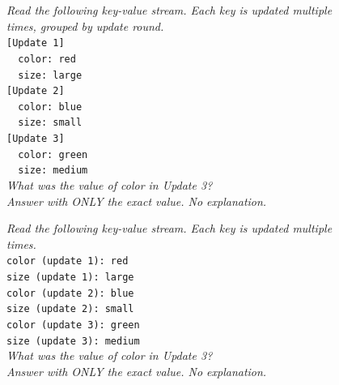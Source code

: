 \documentclass[letterpaper]{article} %
\begin{document}
\begin{figure}[h]
\begin{minipage}[t]{0.48\textwidth}
\begin{tcolorbox}[
    colframe=black!30, colback=gray!4,
    boxrule=0.5pt, arc=2pt,
    left=6pt, right=6pt, top=4pt, bottom=4pt,
    equal height group=fmts,
    title={\textbf{Block} (\texttt{block})},
    fonttitle=\small\bfseries,
    coltitle=black]
\emph{Read the following key-value stream. Each key is updated
multiple times, grouped by update round.}\\[4pt]
\texttt{[Update 1]}\\
\texttt{\ \ color: red}\\
\texttt{\ \ size: large}\\
\texttt{[Update 2]}\\
\texttt{\ \ color: blue}\\
\texttt{\ \ size: small}\\
\texttt{[Update 3]}\\
\texttt{\ \ color: green}\\
\texttt{\ \ size: medium}\\[4pt]
\emph{What was the value of color in Update 3?}\\
\emph{Answer with ONLY the exact value. No explanation.}
\end{tcolorbox}
\end{minipage}\hfill
\begin{minipage}[t]{0.48\textwidth}
\begin{tcolorbox}[
    colframe=black!30, colback=gray!4,
    boxrule=0.5pt, arc=2pt,
    left=6pt, right=6pt, top=4pt, bottom=4pt,
    equal height group=fmts,
    title={\textbf{Labeled} (\texttt{flat\_verbose})},
    fonttitle=\small\bfseries,
    coltitle=black]
\emph{Read the following key-value stream. Each key is updated
multiple times.}\\[4pt]
\texttt{color (update 1): red}\\
\texttt{size (update 1): large}\\
\texttt{color (update 2): blue}\\
\texttt{size (update 2): small}\\
\texttt{color (update 3): green}\\
\texttt{size (update 3): medium}\\[4pt]
\emph{What was the value of color in Update 3?}\\
\emph{Answer with ONLY the exact value. No explanation.}
\end{tcolorbox}


\end{minipage}
\end{figure}
\end{document}
